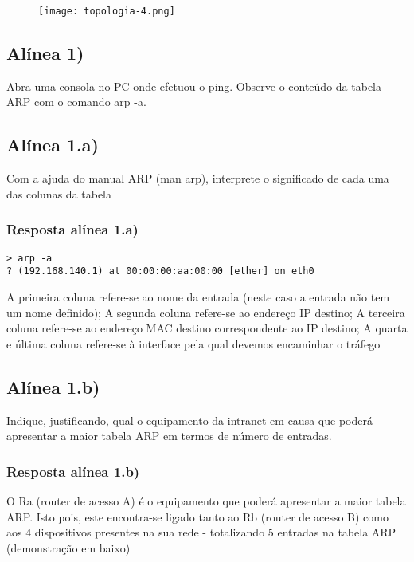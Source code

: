 \documentclass{article}
\begin{document}
\begin{figure}[h!]
    \centering
    \texttt{[image: topologia-4.png]}
\end{figure}

\bigskip
\subsection{Alínea 1)}

Abra uma consola no PC onde efetuou o ping. Observe o conteúdo da tabela ARP com o comando arp -a.

\subsection{Alínea 1.a)}

Com a ajuda do manual ARP (man arp), interprete o significado de cada uma das colunas da tabela

\subsubsection{Resposta alínea 1.a)}

\begin{lstlisting}
> arp -a
? (192.168.140.1) at 00:00:00:aa:00:00 [ether] on eth0
\end{lstlisting}

\noindent A primeira coluna refere-se ao nome da entrada (neste caso a entrada não tem um nome definido); A segunda coluna refere-se ao endereço IP destino; A terceira coluna refere-se ao endereço MAC destino correspondente ao IP destino; A quarta e última coluna refere-se à interface pela qual devemos encaminhar o tráfego

\subsection{Alínea 1.b)}

Indique, justificando, qual o equipamento da intranet em causa que poderá apresentar a maior tabela ARP em termos de número de entradas.

\subsubsection{Resposta alínea 1.b)}

O Ra (router de acesso A) é o equipamento que poderá apresentar a maior tabela ARP. Isto pois, este encontra-se ligado tanto ao Rb (router de acesso B) como aos 4 dispositivos presentes na sua rede - totalizando 5 entradas na tabela ARP (demonstração em baixo)
\end{document}
